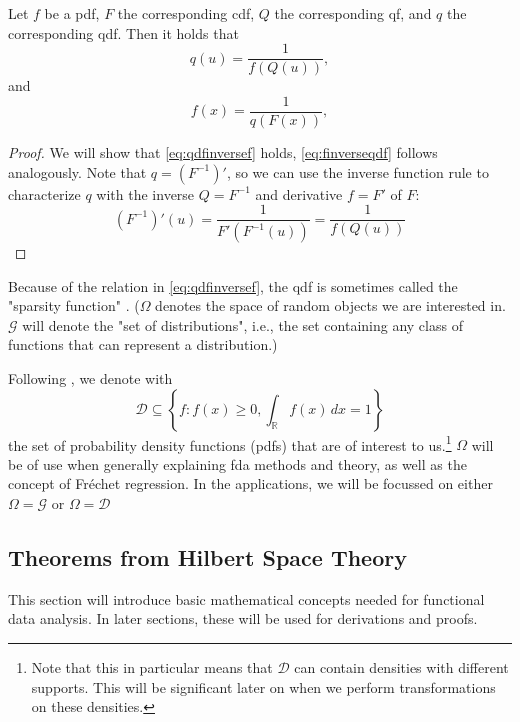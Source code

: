 \begin{lemma}
\label{lemma:f eq inverse qdf}
    Let \(f\) be a pdf, \(F\) the corresponding cdf, \(Q\) the corresponding qf, and
    \(q\) the corresponding qdf. Then it holds that
    \begin{equation}
    \label{eq:qdfinversef}
        {q}(u) = \frac{1}{{f}({Q}(u))},
    \end{equation}
    and
    \begin{equation}
    \label{eq:finverseqdf}
        {f}(x) = \frac{1}{{q}({F}(x))},
    \end{equation}
\end{lemma}
\begin{proof}
    We will show that \eqref{eq:qdfinversef} holds, \eqref{eq:finverseqdf} follows
    analogously. Note that \( q = (F^{-1})' \), so we can use the inverse function
    rule to characterize \(q \) with the inverse $Q = F^{-1}$ and derivative $f = F'$
    of \( F \):
    \begin{equation}
    \label{eq:proof_qdfinversef}
        (F^{-1})'(u) = \frac{1}{{F'}({F^{-1}}(u))} = \frac{1}{{f}({Q}(u))}
    \end{equation}
\end{proof}

Because of the relation in \eqref{eq:qdfinversef}, the qdf is sometimes called the
"sparsity function" \parencite[cf.][]{Tukey1965}.
($\Omega$ denotes the space of random objects
we are interested in. $\mathcal{G}$ will denote the "set of distributions", i.e., the set containing
any class of functions that can represent a distribution.)

Following \textcite{PetersenZhangKokoszka2022}, we denote with
\begin{equation}
\label{eq:density_set}
    \mathcal{D} \subseteq \left\{ f : f(x) \geq 0, \int_{\mathbb{R}} f(x) \, dx = 1 \right\}
\end{equation}
the set of probability density functions (pdfs) that are of interest to us.\footnote{Note that
this in particular means that $\mathcal{D}$ can contain densities with different supports.
This will be significant later on when we perform transformations on these densities.}
$\Omega$ will be of use when generally explaining fda methods and theory, as well as
the concept of Fréchet regression. In the applications, we will be focussed on either
$\Omega = \mathcal{G}$ or $\Omega = \mathcal{D}$

\subsection{Theorems from Hilbert Space Theory}
\label{sec:hilbert spaces}
This section will introduce basic mathematical concepts needed for functional data
analysis. In later sections, these will be used for derivations and proofs.

